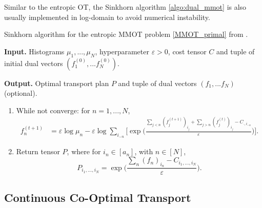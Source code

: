 Similar to the entropic OT, the Sinkhorn algorithm \ref{algo:dual_mmot} is also usually implemented in log-domain to avoid numerical instability.
\begin{algorithm}[h]
  \caption{Sinkhorn algorithm for the entropic MMOT problem \ref{MMOT_primal} from \citep{Benamou14}.}
  \textbf{Input.} Histograms $\mu_1,...,\mu_N$, hyperparameter $\varepsilon > 0$, cost tensor $C$ and
  tuple of initial dual vectors $(f^{(0)}_1, ... f^{(0)}_N)$.

  \textbf{Output.} Optimal transport plan $P$ and tuple of dual vectors $(f_1, ... f_N)$ (optional).
  \begin{enumerate}
    \item While not converge: for $n = 1, ..., N$,
    \begin{equation}
      \begin{split}
        f^{(t+1)}_n &= \varepsilon \log \mu_n - \varepsilon \log \sum_{i_{-n}}
        \Big[ \exp\Big( \frac{\sum_{j < n} (f^{(t+1)}_j)_{i_j} + \sum_{j > n} (f^{(t)}_j)_{i_j} -
        C_{\cdot, i_{-n}}}{\varepsilon} \Big) \Big].
      \end{split}
    \end{equation}
    \item Return tensor $P$, where for $i_n \in [a_n]$, with $n \in [N]$,
    \begin{equation}
      P_{i_1,...,i_N} = \exp\Big( \frac{\sum_n (f_n)_{i_n} - C_{i_1,...,i_N}}{\varepsilon} \Big).
    \end{equation}
  \end{enumerate}
  \label{algo:dual_mmot}
\end{algorithm}

\subsection{Continuous Co-Optimal Transport} \label{annex:cont_coot}

